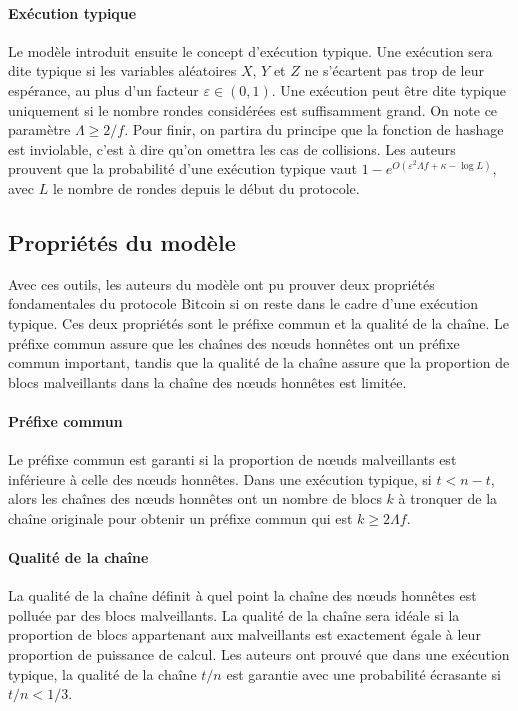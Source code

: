     \paragraph{Exécution typique} Le modèle introduit ensuite le concept
    d'exécution typique. Une exécution sera dite typique si les variables
    aléatoires $X$, $Y$ et $Z$ ne s'écartent pas trop de leur espérance, au plus
    d'un facteur $\varepsilon \in (0,1)$. Une exécution peut être dite typique
    uniquement si le nombre rondes considérées est suffisamment grand. On note ce
    paramètre $\Lambda \geq 2/f$. Pour finir, on partira du principe que la
    fonction de hashage est inviolable, c'est à dire qu'on omettra les cas de
    collisions. Les auteurs prouvent que la probabilité d'une exécution typique
    vaut $1 - e^{O(\varepsilon^2\Lambda f+\kappa-\log{L})}$, avec $L$ le nombre
    de rondes depuis le début du protocole.


    \subsection{Propriétés du modèle}\label{subsec:statique-proprietes}

    Avec ces outils, les auteurs du modèle ont pu prouver deux
    propriétés fondamentales du protocole Bitcoin si on reste dans le cadre
    d'une exécution typique. Ces deux propriétés sont le préfixe commun et la
    qualité de la chaîne. Le préfixe commun assure que les chaînes des nœuds
    honnêtes ont un préfixe commun important, tandis que la qualité de la chaîne
    assure que la proportion de blocs malveillants dans la chaîne des nœuds
    honnêtes est limitée.

    \paragraph{Préfixe commun} Le préfixe commun est garanti si la proportion de
    nœuds malveillants est inférieure à celle des nœuds honnêtes. Dans une
    exécution typique, si $t < n - t$, alors les chaînes des nœuds honnêtes ont
    un nombre de blocs $k$ à tronquer de la chaîne originale pour obtenir un
    préfixe commun qui est $k \geq 2\Lambda f$.

    \paragraph{Qualité de la chaîne} La qualité de la chaîne définit à quel
    point la chaîne des nœuds honnêtes est polluée par des blocs malveillants.
    La qualité de la chaîne sera idéale si la proportion de blocs appartenant
    aux malveillants est exactement égale à leur proportion de puissance de
    calcul. Les auteurs ont prouvé que dans une exécution typique, la qualité de
    la chaîne $t/n$ est garantie avec une probabilité écrasante si $t/n < 1/3$.

